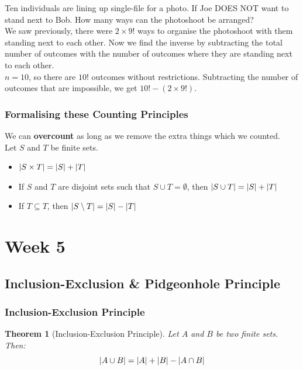 \documentclass[12pt]{article}
\DeclarePairedDelimiter\abs{\lvert}{\rvert}
\newtheorem{theorem}{Theorem}
\theoremstyle{definition}
\begin{document}
    \begin{example}
        Ten individuals are lining up single-file for a photo. If Joe DOES NOT want to stand next to Bob. How
        many ways can the photoshoot be arranged? \\

        We saw previously, there were $2 \times 9!$ ways to organise the photoshoot with them standing next to
        each other. Now we find the inverse by subtracting the total number of outcomes with the number of outcomes
        where they are standing next to each other. \\

        $n = 10$, so there are $10!$ outcomes without restrictions. Subtracting the number of outcomes that are
        impossible, we get $10! - (2 \times 9!)$.
    \end{example}
    \vspace{25px}

    \subsubsection{Formalising these Counting Principles}
    We can \textbf{overcount} as long as we remove the extra things which we counted. \\

    Let $S$ and $T$ be finite sets.
    \begin{itemize}
        \item $\abs{S\times T} = \abs{S} + \abs{T}$
        \item If $S$ and $T$ are disjoint sets such that $S \cup T = \emptyset$,
            then $\abs{S \cup T} = \abs{S} + \abs{T}$
        \item If $T \subseteq T$, then $\abs{S \setminus T} = \abs{S} - \abs{T}$
    \end{itemize}

    \newpage
    \section{Week 5}
    \subsection{Inclusion-Exclusion \& Pidgeonhole Principle}
    \subsubsection{Inclusion-Exclusion Principle}
    \begin{theorem}[Inclusion-Exclusion Principle]
        \label{thm:inclusion-exclusion-principle}
        Let $A$ and $B$ be two finite sets. Then:
        \begin{equation*}
            \abs{A \cup B} = \abs{A} + \abs{B} - \abs{A \cap B}
        \end{equation*}
    \end{theorem}
\end{document}
